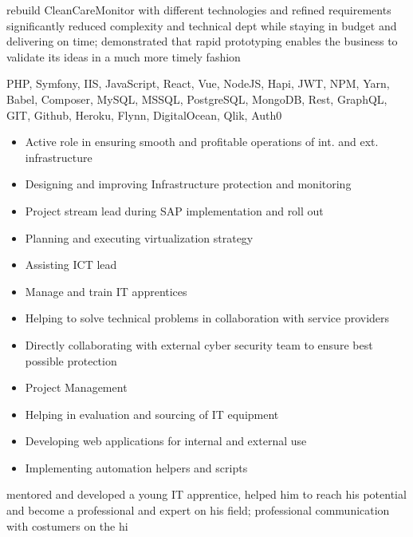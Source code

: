 \documentclass[9pt,a4paper]{altacv}
\begin{document}
rebuild CleanCareMonitor with different technologies and refined requirements significantly reduced complexity and technical dept while staying in budget and delivering on time;
demonstrated that rapid prototyping enables the business to validate its ideas in a much more timely fashion

PHP, Symfony, IIS,
JavaScript, React, Vue, NodeJS, Hapi, JWT, NPM, Yarn, Babel, Composer,
MySQL, MSSQL, PostgreSQL, MongoDB, Rest, GraphQL,
GIT, Github, Heroku, Flynn, DigitalOcean, Qlik, Auth0


\newpage
{}%

%

\begin{itemize}
\item Active role in ensuring smooth and profitable operations of int. and ext. infrastructure
\item Designing and improving Infrastructure protection and monitoring
\item Project stream lead during SAP implementation and roll out
\item Planning and executing virtualization strategy
\item Assisting ICT lead
\item Manage and train IT apprentices
\item Helping to solve technical problems in collaboration with service providers
\item Directly collaborating with external cyber security team to ensure best possible protection
\item Project Management
\item Helping in evaluation and sourcing of IT equipment
\item Developing web applications for internal and external use
\item Implementing automation helpers and scripts

\end{itemize}

mentored and developed a young IT apprentice, helped him to reach his potential and become a professional and expert on his field;
professional communication with costumers on the hi
\end{document}
